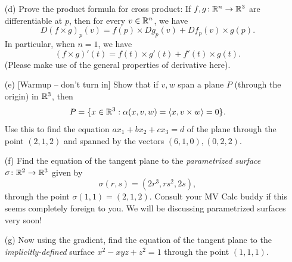 \documentclass[a4paper, 12pt]{article}
\begin{document}
\begin{problem} 
\begin{enumerate}
\begin{itemize}
            \item $e_1\times e_2 = e_3$, $e_2\times e_3 = e_1$, and $e_3\times e_1 = e_2$;
            \item $u\times (v\times w) + v\times(w\times u) +  w\times(u\times v) = 0$ (this is known as a {\em Jacobi identity}, and together with bilinearity and antisymmetry, shows that $\times$ is an example of a {\em Lie bracket});
            \item $\langle v,v\times w\rangle =  \langle w,v\times w\rangle =  0$, and hence $v\times w$ is orthogonal to both $v$ and $w$;
            \item $|\langle u, v\times w\rangle|$ is the volume of the (possibly degenerate) parallelepiped spanned by $u,v,w$;
            \item $|v\times w|$ is the area of the parallelogram spanned by $v$ and $w$ in $\bbr^3$, and hence:
                  \[|v\times w| = |v|\,|w|\sin(\theta),
                  \]
                  where $\theta\in (-\pi/2,\pi/2)$ is the angle between $v$ and $w$;
            \item the orientation of $v\times w$ relative to $v$ and $w$ is determined by the ``right hand rule."
        \end{itemize}
    \item[(d)] Prove the product formula for cross product: If $f,g\colon \mathbb{R}^n\to \mathbb{R}^3$ are differentiable at $p$, then for every $v\in\mathbb{R}^n$, we have
        \[D(f\times g)_p(v) = f(p)\times Dg_p(v) + Df_p(v)\times g(p).
        \]
        In particular, when $n=1$, we have
        \[(f\times g)'(t) = f(t)\times g'(t) + f'(t) \times g(t).
        \]
        (Please make use of the general properties of derivative here).
    \item[(e)] [Warmup -- don't turn in] Show that if $v,w$ span a plane $P$ (through the origin) in $\bbr^3$, then
        \[P = \{x\in \mathbb{R}^3: \alpha(x,v,w) = \langle x, v\times w\rangle = 0\}.
        \]
        Use this to find the equation $ax_1 + bx_2 + cx_3  = d$ of the plane through the point $(2,1,2)$ and spanned by the vectors  $(6,1,0), (0,2,2)$.
    \item[(f)] Find the equation of the tangent plane to the {\em parametrized surface} $\sigma\colon \mathbb{R}^2\to \mathbb{R}^3$ given by
        \[\sigma(r, s) = (2r^3, rs^2, 2s),
        \]
        through the point $\sigma(1,1) = (2,1,2)$. Consult your MV Calc buddy if this seems completely foreign to you. We will be discussing parametrized surfaces very soon!
    \item[(g)] Now using the gradient, find the equation of the tangent plane to the {\em implicitly-defined} surface $x^2 - xyz + z^2 = 1$ through the point $(1,1,1)$.
\end{enumerate}
\end{problem}
\end{document}
